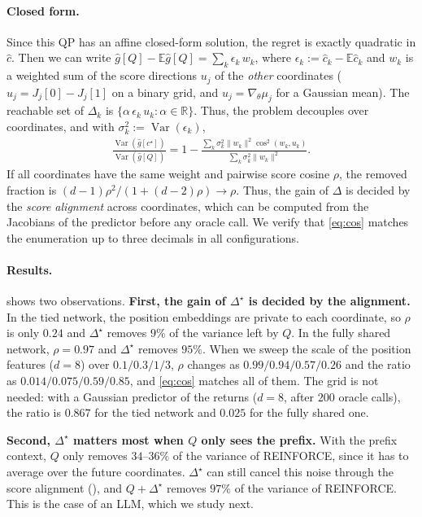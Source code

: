 \documentclass[10pt]{article}
\providecommand{\E}{\mathbb{E}}
\providecommand{\Var}{\operatorname{Var}}
\providecommand{\R}{\mathbb{R}}
\theoremstyle{plain}
\theoremstyle{definition}
\theoremstyle{remark}
\theoremstyle{definition}
\newcommand{\ghat}[1]{\hat g[#1]}            %
\newcommand{\Dstar}{\Delta^{\star}}
\newcommand{\cstar}{c^{\star}}
\begin{document}
\paragraph{Closed form.} Since this QP has an affine closed-form solution, the regret is exactly quadratic in $\hat c$. Then we can write $\ghat{Q}-\E\ghat{Q}=\sum_k \epsilon_k\,w_k$, where $\epsilon_k:=\hat c_k-\E\hat c_k$ and $w_k$ is a weighted sum of the score directions $u_j$ of the \emph{other} coordinates ($u_j=J_j[0]-J_j[1]$ on a binary grid, and $u_j=\nabla_\theta\mu_j$ for a Gaussian mean). The reachable set of $\Delta_k$ is $\{\alpha\,\epsilon_k\,u_k:\alpha\in\R\}$. Thus, the problem decouples over coordinates, and with $\sigma_k^2:=\Var(\epsilon_k)$,
\begin{align}\label{eq:cos}
    \frac{\Var(\ghat{\cstar})}{\Var(\ghat{Q})}=1-\frac{\sum_k\sigma_k^2\|w_k\|^2\cos^2(w_k,u_k)}{\sum_k\sigma_k^2\|w_k\|^2}.
\end{align}
If all coordinates have the same weight and pairwise score cosine $\rho$, the removed fraction is $(d-1)\rho^2/(1+(d-2)\rho)\to\rho$. Thus, the gain of $\Delta$ is decided by the \emph{score alignment} across coordinates, which can be computed from the Jacobians of the predictor before any oracle call. We verify that \eqref{eq:cos} matches the enumeration up to three decimals in all configurations.


\paragraph{Results.}  shows two observations. \textbf{First, the gain of $\Dstar$ is decided by the alignment.} In the tied network, the position embeddings are private to each coordinate, so $\rho$ is only $0.24$ and $\Dstar$ removes $9\%$ of the variance left by $Q$. In the fully shared network, $\rho=0.97$ and $\Dstar$ removes $95\%$. When we sweep the scale of the position features ($d=8$) over $0.1/0.3/1/3$, $\rho$ changes as $0.99/0.94/0.57/0.26$ and the ratio as $0.014/0.075/0.59/0.85$, and \eqref{eq:cos} matches all of them. The grid is not needed: with a Gaussian predictor of the returns ($d=8$, after $200$ oracle calls), the ratio is $0.867$ for the tied network and $0.025$ for the fully shared one.

\textbf{Second, $\Dstar$ matters most when $Q$ only sees the prefix.} With the prefix context, $Q$ only removes $34$--$36\%$ of the variance of REINFORCE, since it has to average over the future coordinates. $\Dstar$ can still cancel this noise through the score alignment (), and $Q{+}\Dstar$ removes $97\%$ of the variance of REINFORCE. This is the case of an LLM, which we study next.
\end{document}
